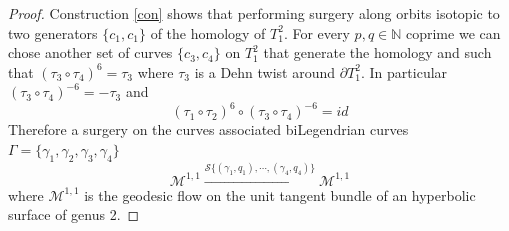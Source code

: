 \documentclass{amsart}
\theoremstyle{definition}
\theoremstyle{remark}
\begin{document}
\begin{proof}
 Construction \ref{con} shows that performing surgery along orbits isotopic to two generators $\{c_1,c_1\}$ of the homology of $T^2_1$. For every $p,q\in \mathbb{N}$ coprime we can chose another set of curves $\{c_3,c_4\}$ on $T_1^2$ that generate the homology and such that $(\tau_3\circ \tau_4)^6=\tau_3$ where $\tau_3$ is a Dehn twist around $\partial T_1^2$. In particular $(\tau_3\circ \tau_4)^{-6}=-\tau_3$ and 
$$(\tau_1\circ \tau_2)^6\circ(\tau_3\circ \tau_4)^{-6}=id$$
Therefore a surgery on the curves associated biLegendrian curves $\Gamma=\{\gamma_1,\gamma_2,\gamma_3,\gamma_4\}$
$$\mathcal{M}^{1,1}\xrightarrow {\mathcal{S}\{(\gamma_1,q_1),\cdots,(\gamma_4,q_4)\}}\mathcal{M}^{1,1}$$
where $\mathcal{M}^{1,1}$ is the geodesic flow on the unit tangent bundle of an hyperbolic surface of genus 2.
\end{proof}


   



\end{document}
